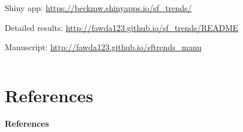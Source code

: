 \documentclass[serif]{beamer}\usepackage[]{graphicx}\usepackage[]{color}
\begin{document}
\begin{frame}
\begin{columns}
\begin{column}{0.9\textwidth}
Shiny app: \href{https://beckmw.shinyapps.io/sf_trends/}{\url{https://beckmw.shinyapps.io/sf_trends/}}

Detailed results: \href{http://fawda123.github.io/sf_trends/README}{\url{http://fawda123.github.io/sf\_trends/README}}

Manuscript: \href{http://fawda123.github.io/sftrends_manu}{\url{http://fawda123.github.io/sftrends\_manu}}
\end{column}
\end{columns}
\end{frame}

\section{References}
\begin{frame}[t]{\textbf{References}}
\tiny
{}


\end{frame}
\end{document}

